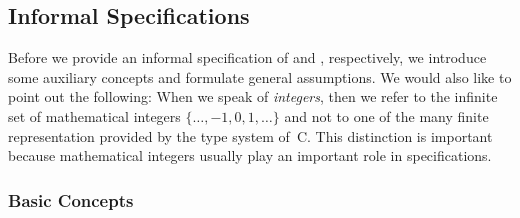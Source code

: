 \clearpage

\subsection{Informal Specifications}
\label{sec:informal-specification}

Before we provide an informal specification of \peek and \poke, respectively,
we introduce some auxiliary concepts and formulate general assumptions.
We would also like to point out the following: 
When we speak of \emph{integers}, then we refer to the infinite set of mathematical
integers $\{\ldots, -1, 0, 1, \ldots\}$
and not to one of the many finite representation provided by the type system of~C.
This distinction is important because mathematical integers
usually play an important role in \acsl specifications.

\subsubsection{Basic Concepts}

